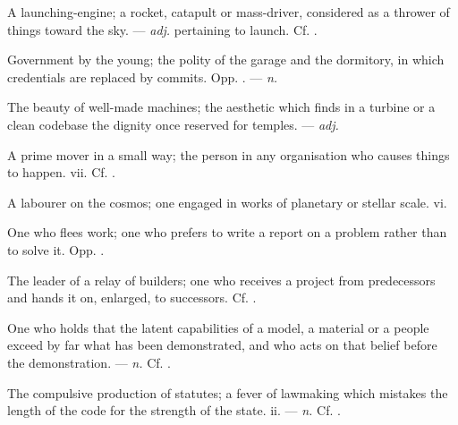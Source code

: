  A launching-engine; a rocket, catapult or mass-driver, considered as a thrower of things toward the sky. ---  \textit{adj.} pertaining to launch. Cf. .

 Government by the young; the polity of the garage and the dormitory, in which credentials are replaced by commits. Opp. . ---  \textit{n.}

 The beauty of well-made machines; the aesthetic which finds in a turbine or a clean codebase the dignity once reserved for temples. ---  \textit{adj.}

 A prime mover in a small way; the person in any organisation who causes things to happen.   vii. Cf. .

 A labourer on the cosmos; one engaged in works of planetary or stellar scale.   vi.

 One who flees work;  one who prefers to write a report on a problem rather than to solve it. Opp. .

 The leader of a relay of builders; one who receives a project from predecessors and hands it on, enlarged, to successors. Cf. .

 One who holds that the latent capabilities of a model, a material or a people exceed by far what has been demonstrated, and who acts on that belief before the demonstration. ---  \textit{n.} Cf. .

 The compulsive production of statutes; a fever of lawmaking which mistakes the length of the code for the strength of the state.   ii. ---  \textit{n.} Cf. .


